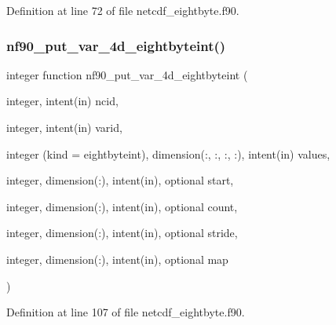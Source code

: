 Definition at line 72 of file netcdf\+\_\+eightbyte.\+f90.

\mbox{\label{netcdf__eightbyte_8f90_a2fcc7dafad70cffd89123ddbd491b3d0}} 
\subsubsection{\texorpdfstring{nf90\+\_\+put\+\_\+var\+\_\+4d\+\_\+eightbyteint()}{nf90\_put\_var\_4d\_eightbyteint()}}
{\footnotesize\ttfamily integer function nf90\+\_\+put\+\_\+var\+\_\+4d\+\_\+eightbyteint (\begin{DoxyParamCaption}\item[{integer, intent(in)}]{ncid,  }\item[{integer, intent(in)}]{varid,  }\item[{integer (kind = eightbyteint), dimension(\+:, \+:, \+:, \+:), intent(in)}]{values,  }\item[{integer, dimension(\+:), intent(in), optional}]{start,  }\item[{integer, dimension(\+:), intent(in), optional}]{count,  }\item[{integer, dimension(\+:), intent(in), optional}]{stride,  }\item[{integer, dimension(\+:), intent(in), optional}]{map }\end{DoxyParamCaption})}



Definition at line 107 of file netcdf\+\_\+eightbyte.\+f90.

\mbox{\label{netcdf__eightbyte_8f90_a7c70c2c6493acd29cd6e7ac1ce969b00}} 
